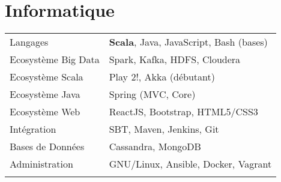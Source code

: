 \documentclass[11pt,a4paper]{moderncv}
\begin{document}
\section{Informatique}
\begin{tabular}{ll}
  \vspace{0.1cm}
  \hspace{0.1cm} Langages & \hspace{0.5cm} \textbf{Scala}, Java, JavaScript, Bash (bases) \\ \vspace{0.1cm}
  \hspace{0.1cm} Ecosystème Big Data & \hspace{0.5cm} Spark, Kafka, HDFS, Cloudera \\ \vspace{0.1cm}
  \hspace{0.1cm} Ecosystème Scala & \hspace{0.5cm} Play 2!, Akka (débutant) \\ \vspace{0.1cm}
  \hspace{0.1cm} Ecosystème Java & \hspace{0.5cm} Spring (MVC, Core) \\ \vspace{0.1cm}
  \hspace{0.1cm} Ecosystème Web & \hspace{0.5cm} ReactJS, Bootstrap, HTML5/CSS3 \\ \vspace{0.1cm}
  \hspace{0.1cm} Intégration & \hspace{0.5cm} SBT, Maven, Jenkins, Git \\ \vspace{0.1cm}
  \hspace{0.1cm} Bases de Données & \hspace{0.5cm} Cassandra, MongoDB \\ \vspace{0.1cm}
  \hspace{0.1cm} Administration & \hspace{0.5cm} GNU/Linux, Ansible, Docker, Vagrant \\ \vspace{0.1cm}
\end{tabular}



\newpage
\end{document}

